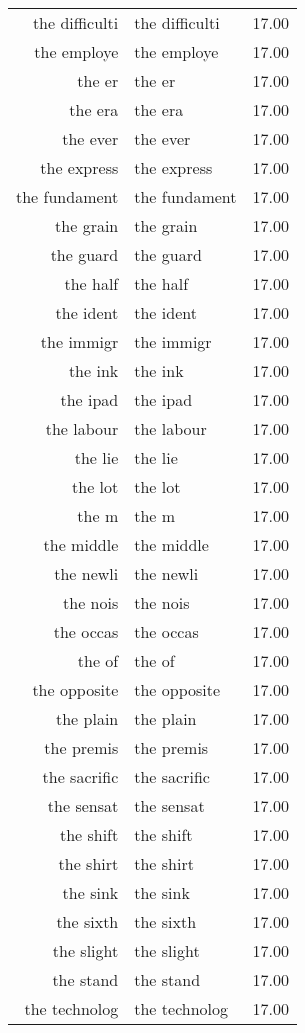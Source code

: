 \begin{table}[ht]
\begin{tabular}{rlr}
  the difficulti & the difficulti & 17.00 \\ 
  the employe & the employe & 17.00 \\ 
  the er & the er & 17.00 \\ 
  the era & the era & 17.00 \\ 
  the ever & the ever & 17.00 \\ 
  the express & the express & 17.00 \\ 
  the fundament & the fundament & 17.00 \\ 
  the grain & the grain & 17.00 \\ 
  the guard & the guard & 17.00 \\ 
  the half & the half & 17.00 \\ 
  the ident & the ident & 17.00 \\ 
  the immigr & the immigr & 17.00 \\ 
  the ink & the ink & 17.00 \\ 
  the ipad & the ipad & 17.00 \\ 
  the labour & the labour & 17.00 \\ 
  the lie & the lie & 17.00 \\ 
  the lot & the lot & 17.00 \\ 
  the m & the m & 17.00 \\ 
  the middle & the middle & 17.00 \\ 
  the newli & the newli & 17.00 \\ 
  the nois & the nois & 17.00 \\ 
  the occas & the occas & 17.00 \\ 
  the of & the of & 17.00 \\ 
  the opposite & the opposite & 17.00 \\ 
  the plain & the plain & 17.00 \\ 
  the premis & the premis & 17.00 \\ 
  the sacrific & the sacrific & 17.00 \\ 
  the sensat & the sensat & 17.00 \\ 
  the shift & the shift & 17.00 \\ 
  the shirt & the shirt & 17.00 \\ 
  the sink & the sink & 17.00 \\ 
  the sixth & the sixth & 17.00 \\ 
  the slight & the slight & 17.00 \\ 
  the stand & the stand & 17.00 \\ 
  the technolog & the technolog & 17.00 \\ 

\end{tabular}
\end{table}
